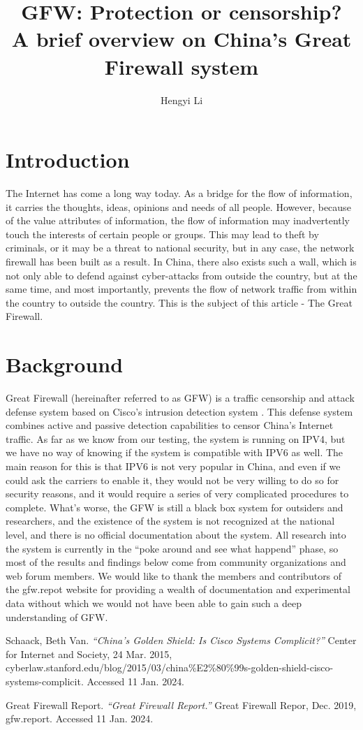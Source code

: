 \documentclass[11pt]{article}
\title{GFW: Protection or censorship?\\ \large A brief overview on China's Great Firewall system}
\author{Hengyi Li}
\begin{document}
\maketitle

\section{Introduction}

The Internet has come a long way today. As a bridge for the flow of information,
it carries the thoughts, ideas, opinions and needs of all people. However,
because of the value attributes of information, the flow of information may
inadvertently touch the interests of certain people or groups. This may lead to
theft by criminals, or it may be a threat to national security, but in any case,
the network firewall has been built as a result. In China, there also exists
such a wall, which is not only able to defend against cyber-attacks from outside
the country, but at the same time, and most importantly, prevents the flow of
network traffic from within the country to outside the country. This is the
subject of this article - The Great Firewall.

\section{Background}
Great Firewall (hereinafter referred to as GFW) is a traffic censorship and
attack defense system based on Cisco's intrusion detection system \cite{CISCO}.
This defense system combines active and passive detection capabilities to censor
China's Internet traffic. As far as we know from our testing, the system is
running on IPV4, but we have no way of knowing if the system is compatible with
IPV6 as well. The main reason for this is that IPV6 is not very popular in China,
and even if we could ask the carriers to enable it, they would not be very
willing to do so for security reasons, and it would require a series of very
complicated procedures to complete. What's worse, the GFW is still a black box
system for outsiders and researchers, and the existence of the system is not
recognized at the national level, and there is no official documentation about
the system. All research into the system is currently in the ``poke around and
see what happend'' phase, so most of the results and findings below come from
community organizations and web forum members. We would like to thank the
members and contributors of the gfw.repot \cite{GFWReport} website for providing a wealth of
documentation and experimental data without which we would not have been able to
gain such a deep understanding of GFW.
\newpage

\begin{thebibliography}{9}
	Schaack, Beth Van. \textit{``China's Golden Shield: Is Cisco Systems Complicit?''} Center
	for Internet and Society, 24 Mar. 2015, cyberlaw.stanford.edu/blog/2015/03/china\%E2\%80\%99s-golden-shield-cisco-systems-complicit.
	Accessed 11 Jan. 2024.

	Great Firewall Report. \textit{``Great Firewall Report.''} Great Firewall Repor, Dec. 2019,
	gfw.report. Accessed 11 Jan. 2024.
\end{thebibliography}
\end{document}
